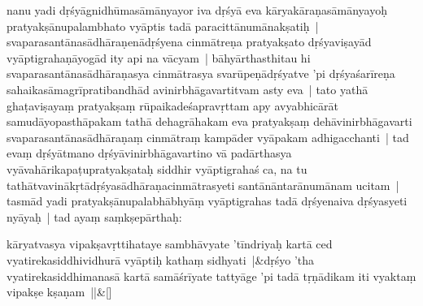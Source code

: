 \documentclass[article,12pt,a4paper]{memoir}%
\newcounter{parCount}
\begin{document}
	  \pstart \leavevmode%
	\label{thakur75-45.13}nanu yadi dṛśyāgnidhūmasāmānyayor iva \label{ratnakīrtinibandhāvali__36r1PF7IMVW9VQKNUGR24RY6CLM}dṛśyā\label{ratnakīrtinibandhāvali__36r1PF7IMVVGFNWYPOLMDXQ8LLU} eva kāryakāraṇasāmānyayoḥ pratyakṣānupalambhato vyāptis tadā paracittānumānakṣatiḥ | svaparasantānasādhāra\label{ratnakīrtinibandhāvali__36r1PF7IMVUOL26OEJJYFE6B0AJ}ṇenādṛśyena\label{ratnakīrtinibandhāvali__36r1PF7IMVTV691SZ12AAL1XY0F} cinmātreṇa pratyakṣato dṛśyaviṣayād \label{ratnakīrtinibandhāvali__36r1PF7IMVSW4O6482CUH1BZRR4}vyāptigrahaṇāyogād ity api na vācyam | bāhyārthasthitau hi svaparasantānasādhāraṇasya cinmātrasya svarūpeṇādṛśyatve 'pi dṛśyaśarīreṇa sahaikasāmagrīpratibandhād avinirbhāgavartitvam asty eva | tato yathā ghaṭaviṣayaṃ pratyakṣaṃ rūpaikadeśapravṛttam apy avyabhicārāt samudāyopasthāpakam tathā dehagrāhakam eva pratyakṣaṃ dehāvinirbhāgavarti svaparasantānasādhāraṇaṃ cinmātraṃ kampāder vyāpakam adhigacchanti | tad evaṃ dṛśyātmano dṛśyāvinirbhāgavartino vā padārthasya vyāvahārikapaṭupratyakṣataḥ siddhir vyāptigrahaś ca, na tu tathātvavinākṛtādṛśyasādhāraṇacinmātrasyeti santānāntarānumānam ucitam | tasmād yadi pratyakṣānupalabhābhyāṃ vyāptigrahas tadā dṛśyenaiva dṛśyasyeti nyāyaḥ | \label{thakur75-45.24} tad ayaṃ saṃkṣepārthaḥ:
	{}
	\pend%
      
	    
	    \stanza[\smallbreak]
	  kāryatvasya vipakṣavṛttihataye sambhāvyate 'tīndriyaḥ kartā ced vyatirekasiddhividhurā vyāptiḥ kathaṃ sidhyati |&dṛśyo 'tha vyatirekasiddhimanasā kartā samāśrīyate tattyāge 'pi tadā tṛṇādikam iti vyaktaṃ vipakṣe kṣaṇam ||\&[\smallbreak]
	  
\end{document}
